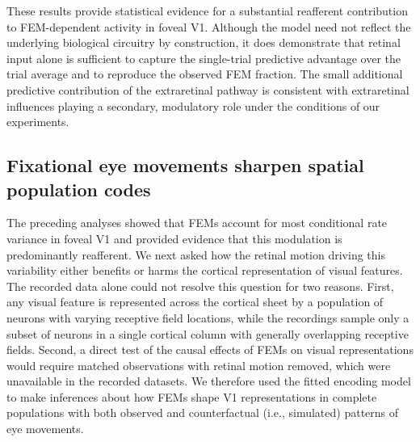 \documentclass{lite}
\begin{document}
These results provide statistical evidence for a substantial reafferent contribution to FEM-dependent activity in foveal V1. Although the model need not reflect the underlying biological circuitry by construction, it does demonstrate that retinal input alone is sufficient to capture the single-trial predictive advantage over the trial average and to reproduce the observed FEM fraction. The small additional predictive contribution of the extraretinal pathway is consistent with extraretinal influences playing a secondary, modulatory role under the conditions of our experiments.



\subsection{Fixational eye movements sharpen spatial population codes}

The preceding analyses showed that FEMs account for most conditional rate variance in foveal V1 and provided evidence that this modulation is predominantly reafferent. We next asked how the retinal motion driving this variability either benefits or harms the cortical representation of visual features. The recorded data alone could not resolve this question for two reasons. First, any visual feature is represented across the cortical sheet by a population of neurons with varying receptive field locations, while the recordings sample only a subset of neurons in a single cortical column with generally overlapping receptive fields. Second, a direct test of the causal effects of FEMs on visual representations would require matched observations with retinal motion removed, which were unavailable in the recorded datasets. We therefore used the fitted encoding model to make inferences about how FEMs shape V1 representations in complete populations with both observed and counterfactual (i.e., simulated) patterns of eye movements.
\end{document}
